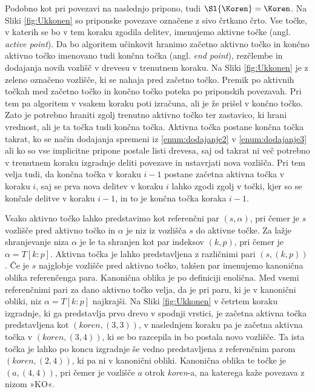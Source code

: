 Podobno kot pri povezavi na naslednjo pripono, tudi $\Sl{\Koren}=\Koren$. Na Sliki \ref{fig:Ukkonen} so priponske povezave označene z sivo črtkano črto. Vse točke, v katerih se bo v tem koraku zgodila delitev, imenujemo aktivne točke (angl. \textit{active point}). Da bo algoritem učinkovit hranimo začetno aktivno točko in končno aktivno točko imenovano tudi končna točka (angl. \textit{end point}), rezčlembe in dodajanja novih vozlišč v drevesu v trenutnem koraku. Na Sliki \ref{fig:Ukkonen} je z zeleno označeno vozlišče, ki se nahaja pred začetno točko. Premik po aktivnih točkah med začetno točko in končno točko poteka po priponskih povezavah. Pri tem pa algoritem v vsakem koraku poti izračuna, ali je že prišel v končno točko. Zato je potrebno hraniti zgolj trenutno aktivno točko ter zastavico, ki hrani vrednost, ali je ta točka tudi končna točka. Aktivna točka postane končna točka takrat, ko se način dodajanja spremeni iz \ref{enum:dodajanje2} v \ref{enum:dodajanje3} ali ko so vse implicitne pripone postale listi drevesa, saj od takrat ni več potrebno v trenutnem koraku izgradnje deliti povezave in ustavrjati nova vozlišča. Pri tem velja tudi, da končna točka v koraku $i-1$ postane začetna aktivna točka v koraku $i$, saj se prva nova delitev v koraku $i$ lahko zgodi zgolj v točki, kjer so se končale delitve v koraku $i-1$, in to je končna točka koraka $i-1$. 

Vsako aktivno točko lahko predstavimo kot referenčni par $(s,\alpha)$, pri čemer je $s$ vozlišče pred aktivno točko in $\alpha$ je niz iz vozlišča $s$ do aktivne točke. Za lažje shranjevanje niza $\alpha$ je le ta shranjen kot par indeksov $(k,p)$, pri čemer je $\alpha=T[k:p]$. Aktivna točka je lahko predstavljena z različnimi pari $(s, (k,p))$. Če je $s$  najglobje vozlišče pred aktivno točko, takšen par imenujemo kanonična oblika referenčenga para. Kanonična oblika je po definiciji enolična. Med vsemi referenčnimi pari za dano aktivno točko velja, da je pri paru, ki je v kanonični obliki, niz $\alpha=T[k:p]$ najkrajši. Na Sliki \ref{fig:Ukkonen} v četrtem koraku izgradnje, ki ga predstavlja prvo drevo v spodnji vrstici, je začetna aktivna točka predstavljena kot $(\textit{koren},(3,3))$, v naslednjem koraku pa je začetna aktivna točka v $(\textit{koren},(3,4))$, ki se bo razcepila in bo postala novo vozlišče. Ta ista točka je lahko po koncu izgradnje še vedno predstavljena z referenčnim parom $(\textit{koren},(2,4))$, ki pa ni v kanonični obliki. Kanonična oblika te točke je $(a,(4,4))$, pri čemer je vozlišče $a$ otrok \textit{koren}-a, na katerega kaže povezava z nizom »KO«.

